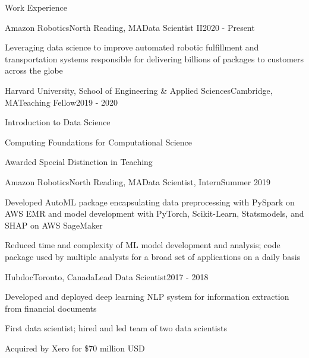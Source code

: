 \documentclass{resume} %
\begin{document}
\begin{rSection}{Work Experience}

\begin{rSubsection}{Amazon Robotics}{North Reading, MA}{Data Scientist II}{2020 - Present}
	\item Leveraging data science to improve automated robotic fulfillment and transportation systems responsible for delivering billions of packages to customers across the globe
\end{rSubsection}
\begin{rSubsection}{Harvard University, School of Engineering \& Applied Sciences}{Cambridge, MA}{Teaching Fellow}{2019 - 2020}
	\item Introduction to Data Science
	\item Computing Foundations for Computational Science
	\item Awarded Special Distinction in Teaching
\end{rSubsection}
\begin{rSubsection}{Amazon Robotics}{North Reading, MA}{Data Scientist, Intern}{Summer 2019}
	\item Developed AutoML package encapsulating data preprocessing with PySpark on AWS EMR and model development with PyTorch, Scikit-Learn, Statsmodels, and SHAP on AWS SageMaker
	\item Reduced time and complexity of ML model development and analysis; code package used by multiple analysts for a broad set of applications on a daily basis
\end{rSubsection}
\begin{rSubsection}{Hubdoc}{Toronto, Canada}{Lead Data Scientist}{2017 - 2018}
	\item Developed and deployed deep learning NLP system for information extraction from financial documents
	\item First data scientist; hired and led team of two data scientists
	\item Acquired by Xero for \$70 million USD
\end{rSubsection}

\end{rSection}
\end{document}
